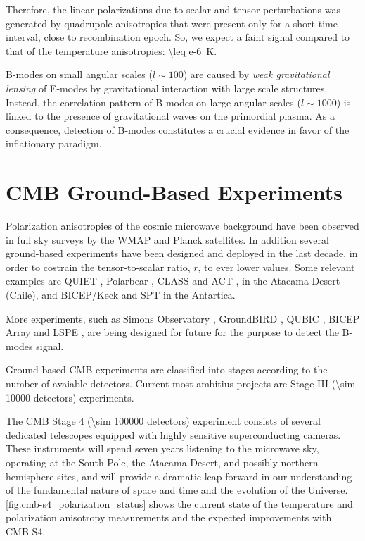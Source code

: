 Therefore, the linear polarizations due to scalar and tensor perturbations was
generated by quadrupole anisotropies that were present only for a short time
interval, close to recombination epoch. So, we expect a faint signal compared to
that of the temperature anisotropies: \SI{\leq e-6}{\kelvin}.

B-modes on small angular scales ($l \sim 100$) are caused by
\emph{weak gravitational lensing} of E-modes by gravitational interaction
with large scale structures. Instead, the correlation pattern of B-modes on
large angular scales ($l \sim 1000$) is linked to the presence of
gravitational waves on the primordial plasma. As a consequence, detection of
B-modes constitutes a crucial evidence in favor of the inflationary
paradigm.

\section{CMB Ground-Based Experiments}\label{s:cmb_ground_based}

Polarization anisotropies of the cosmic microwave background have been
observed in full sky surveys by the WMAP and Planck satellites. In addition
several ground-based experiments have been designed and deployed in the
last decade, in order to costrain the tensor-to-scalar ratio, $r$, to ever
lower values. Some relevant examples are QUIET
\autocite{quiet2010first}\autocite{araujo2012second}, Polarbear
\autocite{kermish2012polarbear}, CLASS \autocite{essinger2014class} and ACT
\autocite{kosowsky2003atacama}, in the Atacama Desert (Chile), and
BICEP/Keck \autocite{ade2018measurements} and SPT \autocite{ruhl2004south}
in the Antartica.

More experiments, such as  Simons Observatory
\autocite{galitzki2018simons}, GroundBIRD \autocite{tajima2012groundbird},
QUBIC \autocite{battistelli2011qubic}, BICEP Array \autocite{hui2018bicep}
and LSPE \autocite{aiola2012large}\autocite{addamo2020large}, are being
designed for future for the purpose to detect the B-modes signal.

Ground based CMB experiments are classified into stages according to the
number of avaiable detectors. Current most ambitius projects are Stage III
(\num{\sim 10000} detectors) experiments.

The CMB Stage 4 (\num{\sim 100000} detectors) experiment
\autocite{abazajian2020cmb} consists of several dedicated telescopes
equipped with highly sensitive superconducting cameras. These instruments
will spend seven years listening to the microwave sky, operating at the
South Pole, the Atacama Desert, and possibly northern hemisphere sites, and
will provide a dramatic leap forward in our understanding of the
fundamental nature of space and time and the evolution of the Universe.
\autoref{fig:cmb-s4_polarization_status} shows the current state of the
temperature and polarization anisotropy measurements and the expected
improvements with CMB-S4.

